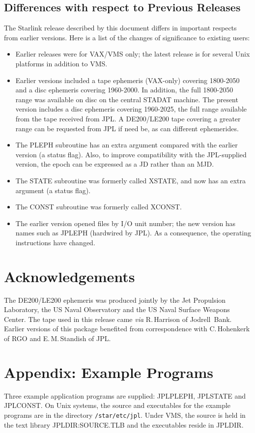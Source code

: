 \subsection{Differences with respect to Previous Releases}
The Starlink release described by this
document differs in important respects from earlier versions.
Here is a list of the changes of significance to existing users:
\begin{itemize}
\item Earlier releases were for VAX/VMS only; the latest release
is for several Unix platforms in addition to VMS.
\item Earlier versions included a tape ephemeris (VAX-only) covering
1800-2050 and a disc ephemeris covering 1960-2000.  In addition,
the full 1800-2050 range was available on disc on the central
STADAT machine. The present
version includes a disc ephemeris covering 1960-2025, the full range
available from the tape received from JPL.  A DE200/LE200 tape covering a
greater range can be requested from JPL if need be, as can
different ephemerides.
\item The PLEPH subroutine has an extra argument compared with
the earlier version (a status flag).  Also, to improve compatibility
with the JPL-supplied version,
the epoch can be expressed as a JD rather than an MJD.
\item The STATE subroutine was formerly called XSTATE, and now has an
extra argument (a status flag).
\item The CONST subroutine was formerly called XCONST.
\item The earlier version opened files by I/O unit number;  the
new version has names such as JPLEPH (hardwired by JPL).  As a
consequence, the operating instructions have changed.
\end{itemize}

\section{Acknowledgements}
The DE200/LE200 ephemeris was produced jointly by the Jet Propulsion Laboratory,
the US Naval Observatory and the US Naval Surface Weapons Center.
The tape used in this release came {\it via}\/ R.\,Harrison
of Jodrell~Bank.  Earlier versions of this package
benefited from correspondence with
C.\,Hohenkerk of RGO and E.\,M.\,Standish of JPL.
\pagebreak
\appendix
\section{Appendix: Example Programs}
Three example application programs are supplied: JPLPLEPH, JPLSTATE
and JPLCONST.
On Unix systems, the source and executables for the
example programs are in the directory \verb|/star/etc/jpl|.
Under VMS, the
source is held in the
text library JPLDIR:SOURCE.TLB and the executables reside in
JPLDIR.

